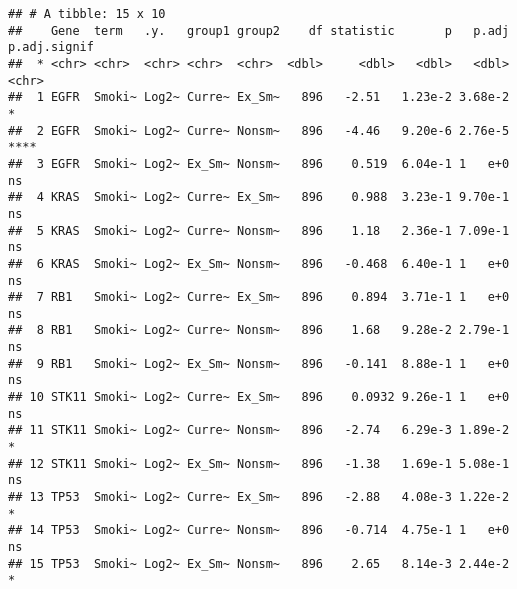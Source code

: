 \documentclass[
]{article}
\begin{document}
\begin{verbatim}
## # A tibble: 15 x 10
##    Gene  term   .y.   group1 group2    df statistic       p   p.adj p.adj.signif
##  * <chr> <chr>  <chr> <chr>  <chr>  <dbl>     <dbl>   <dbl>   <dbl> <chr>       
##  1 EGFR  Smoki~ Log2~ Curre~ Ex_Sm~   896   -2.51   1.23e-2 3.68e-2 *           
##  2 EGFR  Smoki~ Log2~ Curre~ Nonsm~   896   -4.46   9.20e-6 2.76e-5 ****        
##  3 EGFR  Smoki~ Log2~ Ex_Sm~ Nonsm~   896    0.519  6.04e-1 1   e+0 ns          
##  4 KRAS  Smoki~ Log2~ Curre~ Ex_Sm~   896    0.988  3.23e-1 9.70e-1 ns          
##  5 KRAS  Smoki~ Log2~ Curre~ Nonsm~   896    1.18   2.36e-1 7.09e-1 ns          
##  6 KRAS  Smoki~ Log2~ Ex_Sm~ Nonsm~   896   -0.468  6.40e-1 1   e+0 ns          
##  7 RB1   Smoki~ Log2~ Curre~ Ex_Sm~   896    0.894  3.71e-1 1   e+0 ns          
##  8 RB1   Smoki~ Log2~ Curre~ Nonsm~   896    1.68   9.28e-2 2.79e-1 ns          
##  9 RB1   Smoki~ Log2~ Ex_Sm~ Nonsm~   896   -0.141  8.88e-1 1   e+0 ns          
## 10 STK11 Smoki~ Log2~ Curre~ Ex_Sm~   896    0.0932 9.26e-1 1   e+0 ns          
## 11 STK11 Smoki~ Log2~ Curre~ Nonsm~   896   -2.74   6.29e-3 1.89e-2 *           
## 12 STK11 Smoki~ Log2~ Ex_Sm~ Nonsm~   896   -1.38   1.69e-1 5.08e-1 ns          
## 13 TP53  Smoki~ Log2~ Curre~ Ex_Sm~   896   -2.88   4.08e-3 1.22e-2 *           
## 14 TP53  Smoki~ Log2~ Curre~ Nonsm~   896   -0.714  4.75e-1 1   e+0 ns          
## 15 TP53  Smoki~ Log2~ Ex_Sm~ Nonsm~   896    2.65   8.14e-3 2.44e-2 *
\end{verbatim}
\end{document}
